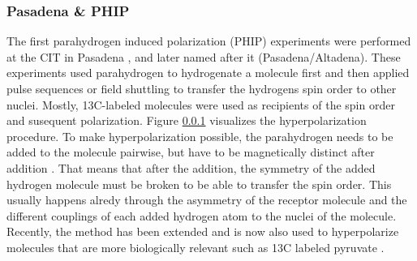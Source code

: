        \subsubsection{Pasadena \& PHIP}
        The first parahydrogen induced polarization (PHIP) experiments were performed at the CIT in Pasadena \cite{bowers_parahydrogen_1987-2}, and later named after it (Pasadena/Altadena). These experiments used parahydrogen to hydrogenate a molecule first and then applied pulse sequences or field shuttling to transfer the hydrogens spin order to other nuclei. Mostly, 13C-labeled molecules were used as recipients of the spin order and susequent polarization. Figure \ref{} visualizes the hyperpolarization procedure. To make hyperpolarization possible, the parahydrogen needs to be added to the molecule pairwise, but have to be magnetically distinct after addition \cite{eisenberg_parahydrogen-induced_1991}. That means that after the addition, the symmetry of the added hydrogen molecule must be broken to be able to transfer the spin order. This usually happens alredy through the asymmetry of the receptor molecule and the different couplings of each added hydrogen atom to the nuclei of the molecule. Recently, the method has been extended and is now also used to hyperpolarize molecules that are more biologically relevant such as 13C labeled pyruvate \cite{cavallari_metabolic_2019}.
